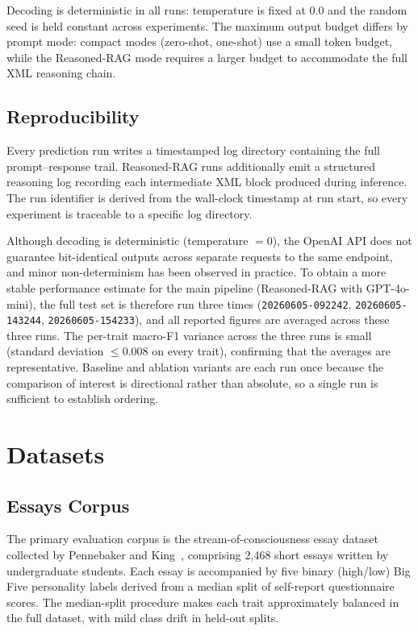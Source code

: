 \documentclass[../main.tex]{subfiles}
\begin{document}
Decoding is deterministic in all runs: temperature is fixed at 0.0 and the
random seed is held constant across experiments.
The maximum output budget differs by prompt mode: compact modes (zero-shot,
one-shot) use a small token budget, while the Reasoned-RAG mode requires a
larger budget to accommodate the full XML reasoning chain.

\subsection{Reproducibility}

Every prediction run writes a timestamped log directory containing the full
prompt--response trail.
Reasoned-RAG runs additionally emit a structured reasoning log recording each
intermediate XML block produced during inference.
The run identifier is derived from the wall-clock timestamp at run start, so
every experiment is traceable to a specific log directory.

Although decoding is deterministic (temperature $= 0$), the OpenAI API does not
guarantee bit-identical outputs across separate requests to the same endpoint,
and minor non-determinism has been observed in practice.
To obtain a more stable performance estimate for the main pipeline
(Reasoned-RAG with GPT-4o-mini), the full test set is therefore run three times
(\texttt{20260605-092242}, \texttt{20260605-143244}, \texttt{20260605-154233}),
and all reported figures are averaged across these three runs.
The per-trait macro-F1 variance across the three runs is small (standard
deviation $\leq 0.008$ on every trait), confirming that the averages are
representative. Baseline and ablation variants are each run once because
the comparison of interest is directional rather than absolute, so a single run
is sufficient to establish ordering.

\section{Datasets}
\label{sec:datasets}

\subsection{Essays Corpus}

The primary evaluation corpus is the stream-of-consciousness essay dataset
collected by Pennebaker and King~\cite{pennebaker1999linguistic}, comprising
2{,}468 short essays written by undergraduate students.
Each essay is accompanied by five binary (high/low) Big Five personality
labels derived from a median split of self-report questionnaire scores.
The median-split procedure makes each trait approximately balanced in the
full dataset, with mild class drift in held-out splits.
\end{document}
